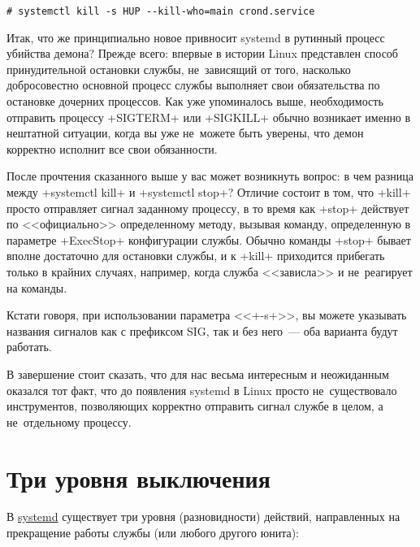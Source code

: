 \documentclass[10pt,oneside,a4paper]{article}
\begin{document}
\begin{Verbatim}
# systemctl kill -s HUP --kill-who=main crond.service
\end{Verbatim}

Итак, что же принципиально новое привносит systemd в рутинный процесс
убийства демона? Прежде всего: впервые в истории Linux представлен способ
принудительной остановки службы, не~зависящий от того, насколько
добросовестно основной процесс службы выполняет свои обязательства по
остановке дочерних процессов. Как уже упоминалось выше, необходимость
отправить процессу +SIGTERM+ или +SIGKILL+ обычно возникает именно
в нештатной ситуации, когда вы уже не~можете быть уверены, что демон
корректно исполнит все свои обязанности.

После прочтения сказанного выше у вас может возникнуть вопрос: в чем разница
между +systemctl kill+ и +systemctl stop+? Отличие состоит в том,
что +kill+ просто отправляет сигнал заданному процессу, в то время как
+stop+ действует по <<официально>> определенному методу, вызывая команду,
определенную в параметре +ExecStop+ конфигурации службы. Обычно команды
+stop+ бывает вполне достаточно для остановки службы, и к +kill+
приходится прибегать только в крайних случаях, например, когда служба
<<зависла>> и не~реагирует на команды.

Кстати говоря, при использовании параметра <<+-s+>>, вы можете указывать
названия сигналов как с префиксом SIG, так и без него~--- оба варианта будут
работать.

В завершение стоит сказать, что для нас весьма интересным и неожиданным
оказался тот факт, что до появления systemd в Linux просто не~существовало
инструментов, позволяющих корректно отправить сигнал службе в целом, а
не~отдельному процессу.

\section{Три уровня выключения}
\label{sec:off}

В \href{http://www.freedesktop.org/wiki/Software/systemd}{systemd} существует
три уровня (разновидности) действий, направленных на прекращение работы службы
(или любого другого юнита):
\end{document}
